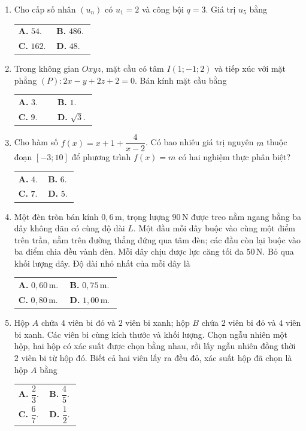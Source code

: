 \documentclass[12pt,a4paper]{article}
\makeatletter
\newcommand{\bonpa}[4]{\par\smallskip\noindent
  \begin{tabular}{@{}p{0.47\linewidth}p{0.47\linewidth}@{}}
  \textbf{A.} #1 & \textbf{B.} #2\\[3pt]
  \textbf{C.} #3 & \textbf{D.} #4
  \end{tabular}}
\makeatother
\begin{document}
\begin{enumerate}
\item Cho cấp số nhân $(u_n)$ có $u_1=2$ và công bội $q=3$. Giá trị $u_5$ bằng
\bonpa{$54$.}{$486$.}{$162$.}{$48$.}

\item Trong không gian $Oxyz$, mặt cầu có tâm $I(1;-1;2)$ và tiếp xúc với mặt phẳng $(P):2x-y+2z+2=0$. Bán kính mặt cầu bằng
\bonpa{$3$.}{$1$.}{$9$.}{$\sqrt{3}$.}

\item Cho hàm số $f(x)=x+1+\dfrac{4}{x-2}$. Có bao nhiêu giá trị nguyên $m$ thuộc đoạn $[-3;10]$ để phương trình $f(x)=m$ có hai nghiệm thực phân biệt?
\bonpa{$4$.}{$6$.}{$7$.}{$5$.}

\item Một đèn tròn bán kính $0{,}6\,\mathrm m$, trọng lượng $90\,\mathrm N$ được treo nằm ngang bằng ba dây không dãn có cùng độ dài $L$. Một đầu mỗi dây buộc vào cùng một điểm trên trần, nằm trên đường thẳng đứng qua tâm đèn; các đầu còn lại buộc vào ba điểm chia đều vành đèn. Mỗi dây chịu được lực căng tối đa $50\,\mathrm N$. Bỏ qua khối lượng dây. Độ dài nhỏ nhất của mỗi dây là
\bonpa{$0{,}60\,\mathrm m$.}{$0{,}75\,\mathrm m$.}{$0{,}80\,\mathrm m$.}{$1{,}00\,\mathrm m$.}

\item Hộp $A$ chứa $4$ viên bi đỏ và $2$ viên bi xanh; hộp $B$ chứa $2$ viên bi đỏ và $4$ viên bi xanh. Các viên bi cùng kích thước và khối lượng. Chọn ngẫu nhiên một hộp, hai hộp có xác suất được chọn bằng nhau, rồi lấy ngẫu nhiên đồng thời $2$ viên bi từ hộp đó. Biết cả hai viên lấy ra đều đỏ, xác suất hộp đã chọn là hộp $A$ bằng
\bonpa{$\dfrac{2}{3}$.}{$\dfrac{4}{5}$.}{$\dfrac{6}{7}$.}{$\dfrac{1}{2}$.}
\end{enumerate}

\end{document}
